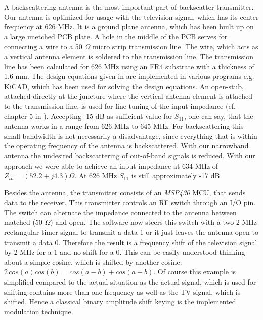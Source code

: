 \documentclass[conference]{IEEEtran}
\begin{document}
A backscattering antenna is the most important part of backscatter
transmitter. Our antenna is optimized for usage with the television
signal, which has its center frequency at 626 MHz. It is a ground plane
antenna, which has been built up on a large unetched PCB plate. A hole
in the middle of the PCB serves for connecting a wire to a 50
\ensuremath{\Omega} micro strip transmission line. The wire, which acts
as a vertical antenna element is soldered to the transmission line. The
transmission line has been calculated for 626 MHz using an FR4 substrate
with a thickness of 1.6 mm. The design equations given in
\cite{pozar_microwave_2011} are implemented in various programs e.g.
KiCAD, which has been used for solving the design equations. An
open-stub, attached directly at the juncture where the vertical antenna
element is attached to the transmission line, is used for fine tuning of
the input impedance (cf. chapter 5 in \cite{pozar_microwave_2011}).
Accepting -15 dB as sufficient value for \ensuremath{S_{11}}, one can
say, that the antenna works in a range from 626 MHz to 645 MHz. For
backscattering this small bandwidth is not necessarily a disadvantage,
since everything that is within the operating frequency of the antenna
is backscattered. With our narrowband antenna the undesired
backscattering of out-of-band signals is reduced.  With our approach we
were able to achieve an input impedance at 634 MHz of
\ensuremath{Z_{in}=(52.2 + j 4.3) \Omega}. At 626 MHz
\ensuremath{S_{\text{11}}} is still approximately -17 dB.

Besides the antenna, the transmitter consists of an \textit{MSP430} MCU,
that sends data to the receiver. This transmitter controls an RF switch
through an I/O pin. The switch can alternate the impedance connected to
the antenna between matched (50 \ensuremath{\Omega}) and open. The
software now steers this switch with a two 2 MHz rectangular timer
signal to transmit a data 1 or it just leaves the antenna open to
transmit a data 0. Therefore the result is a frequency shift of the
television signal by 2 MHz for a 1 and no shift for a 0. This can be
easily understood thinking about a simple cosine, which is shifted by
another cosine: \ensuremath{2\,cos(a)cos(b)=cos(a-b)+cos(a+b)}. Of
course this example is simplified compared to the actual situation as
the actual signal, which is used for shifting contains more than one
frequency as well as the TV signal, which is shifted. Hence a classical
binary amplitude shift keying is the implemented modulation technique.   
 
\end{document}
